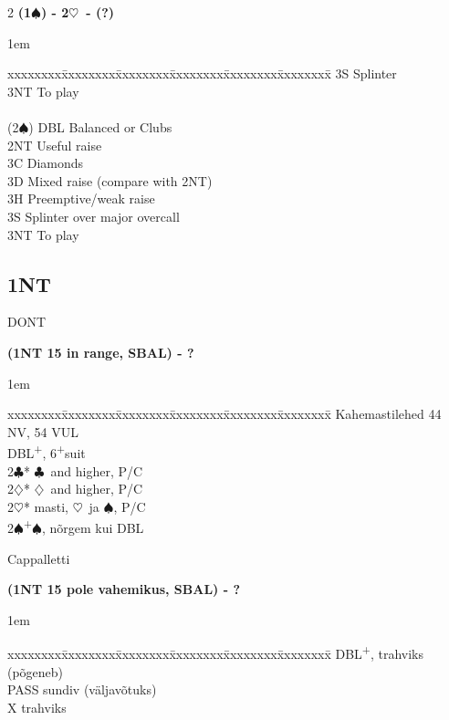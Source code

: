 \documentclass[10pt]{article}
\renewcommand{\c}{$\clubsuit$}
\renewcommand{\d}{$\diamondsuit$}
\newcommand{\h}{$\heartsuit$}
\newcommand{\s}{$\spadesuit$}
\newcommand{\p}{\textsuperscript{+}}
\newcommand{\x}{DBL}
\newenvironment{bidtable}[1][]
{\textbf{#1}
  \begin{adjustwidth}{1em}{}
    \addvspace{2pt}
    \begin{tabbing}
      xxxxxxxx\=xxxxxxxx\=xxxxxxxx\=xxxxxxxx\=xxxxxxxx\=xxxxxxxx\=\kill}
{\end{tabbing}\end{adjustwidth}\bigskip}%
\begin{document}
\begin{multicols*}{2}
\begin{bidtable}[(1\s) - 2\h\ - (?)]
       \> 3S   \> Splinter                                                                         \\
       \> 3NT  \> To play                                                                          \\
                                                                                                   \\
(2\s)  \> DBL  \> Balanced or Clubs                                                                \\
       \> 2NT  \> Useful raise                                                                     \\
       \> 3C   \> Diamonds                                                                         \\
       \> 3D   \> Mixed raise (compare with 2NT)                                                   \\
       \> 3H   \> Preemptive/weak raise                                                            \\
       \> 3S   \> Splinter over major overcall                                                     \\
       \> 3NT  \> To play
\end{bidtable}



\subsection{1NT}

DONT

\begin{bidtable}[(1NT 15 in range, SBAL) - ?]
Kahemastilehed 44 NV, 54 VUL        \\
\x   {}\p, 6\p suit              \\
2\c* \> \c\ and higher, P/C \\
2\d* \> \d\ and higher, P/C \\
2\h* {} masti, \h\ ja \s, P/C     \\
2\s  {}\p\s, nõrgem kui \x
\end{bidtable}

Cappalletti

\begin{bidtable}[(1NT 15 pole vahemikus, SBAL) - ?]
\x {}\p, trahviks                   \\
  \> (põgeneb)                        \\
  \>  \> PASS \> sundiv (väljavõtuks) \\
  \>  \> X    \> trahviks


\end{bidtable}
\end{multicols*}
\end{document}
